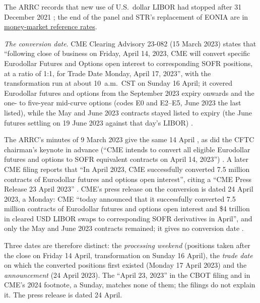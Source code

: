 \begin{qfmethod}
The ARRC records that new use of U.S.\ dollar LIBOR had stopped after 31 December 2021 \citep[web page]{arrc-sofr-transition}; the end of the panel and \texteuro{}STR's replacement of EONIA are in \hyperref[def:money-market-reference-rates]{money-market reference rates}.

\emph{The conversion date}. CME Clearing Advisory 23-082 (15 March 2023) states that ``following close of business on Friday, April 14, 2023, CME will convert specific Eurodollar Futures and Options open interest to corresponding SOFR positions, at a ratio of 1:1, for Trade Date Monday, April 17, 2023'', with the transformation run at about 10~a.m.\ CST on Sunday 16 April; it covered Eurodollar futures and options from the September 2023 expiry onwards and the one- to five-year mid-curve options (codes E0 and E2--E5, June 2023 the last listed), while the May and June 2023 contracts stayed listed to expiry (the June futures settling on 19 June 2023 against that day's LIBOR) \citep[p.~1]{cme-23-082}.

The ARRC's minutes of 9 March 2023 give the same 14 April \citep[p.~1]{arrc-minutes-2023-03-09}, as did the CFTC chairman's keynote in advance (``CME intends to convert all eligible Eurodollar futures and options to SOFR equivalent contracts on April 14, 2023'') \citep[keynote text]{cftc-behnam-libor}. A later CME filing reports that ``In April 2023, CME successfully converted 7.5 million contracts of Eurodollar futures and options open interest'', citing a ``CME Press Release 23 April 2023'' \citep[p.~4 (PDF p.~5), n.~7]{cme-24-271}. CME's press release on the conversion is dated 24 April 2023, a Monday: CME ``today announced that it successfully converted 7.5 million contracts of Eurodollar futures and options open interest and \$4 trillion in cleared USD LIBOR swaps to corresponding SOFR derivatives in April'', and only the May and June 2023 contracts remained; it gives no conversion date \citep[reprint dated 24/04/2023]{cme-pr-2023-04-24}.

Three dates are therefore distinct: the \emph{processing weekend} (positions taken after the close on Friday 14 April, transformation on Sunday 16 April), the \emph{trade date} on which the converted positions first existed (Monday 17 April 2023) and the \emph{announcement} (24 April 2023). The ``April 23, 2023'' in the CBOT filing and in CME's 2024 footnote, a Sunday, matches none of them; the filings do not explain it. The press release is dated 24 April.


\end{qfmethod}
